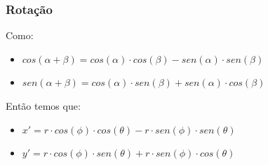 \documentclass[fleqn]{beamer}
\begin{document}

\begin{frame}
\frametitle{Rotação}

	\begin{block}{Como:}
		\begin{itemize}
			\item $cos(\alpha + \beta) = cos(\alpha) \cdot cos(\beta) - sen(\alpha)\cdot sen(\beta)$
			\item $sen(\alpha + \beta) = cos(\alpha) \cdot sen(\beta)   + sen(\alpha)\cdot cos(\beta)$
		\end{itemize}
	\end{block}

	\begin{block}{Então temos que:}
		\begin{itemize}
			\item $ x' =  r \cdot cos(\phi) \cdot cos(\theta) - r \cdot sen(\phi) \cdot sen(\theta)$
			\item $ y' =  r \cdot cos(\phi) \cdot sen(\theta) + r \cdot sen(\phi) \cdot cos(\theta)$
		\end{itemize}
	\end{block}
	
\end{frame}

\end{document}
